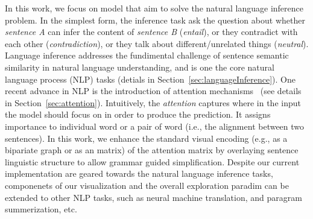 In this work, we focus on model that aim to solve the natural language inference problem. In the simplest form, the inference task ask the question about whether \emph{sentence A} can infer the content of \emph{sentence B}  (\emph{entail}), or they contradict with each other (\emph{contradiction}), or they talk about different/unrelated things (\emph{neutral}). Language inference addresses the fundimental challenge of sentence semantic similarity in natural language understanding, and is one the core natural language process (NLP) tasks (detials in Section~\ref{sec:languageInference}).
%
One recent advance in NLP is the introduction of attention mechanisms~\cite{VaswaniShazeerParmar2017} (see details in Section~\ref{sec:attention}). Intuitively, the \emph{attention} captures where in the input the model should focus on in order to produce the prediction. It assigns importance to individual word or a pair of word (i.e., the alignment between two sentences). In this work, we enhance the standard visual encoding (e.g., as a bipariate graph or as an matrix) of the attention matrix by overlaying sentence linguistic structure to allow grammar guided simplification.
%
%
Despite our current implementation are geared towards the natural language inference tasks, componenets of our visualization and the overall exploration paradim can be extended to other NLP tasks, such as neural machine translation, and paragram summerization, etc.

